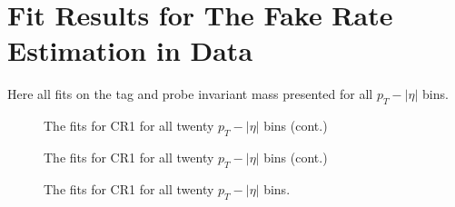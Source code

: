 
\chapter{Fit Results for The Fake Rate Estimation in Data} %

\label{AppendixA} %

Here all fits on the tag and probe invariant mass presented for all $p_T-|\eta|$ bins. 

\begin{figure}[H]
\begin{center}
\scalebox{0.35}{}\scalebox{0.35}{}
\scalebox{0.35}{}\scalebox{0.35}{}
\scalebox{0.35}{}\scalebox{0.35}{}
\caption{The fits for CR1 for all twenty $p_T-|\eta|$ bins (cont.)}
\label{fig:fit_cr1}
\end{center}
\end{figure}

\begin{figure}[H]
\begin{center}
\scalebox{0.35}{}\scalebox{0.35}{}
\scalebox{0.35}{}\scalebox{0.35}{}
\scalebox{0.35}{}\scalebox{0.35}{}
\scalebox{0.35}{}\scalebox{0.35}{}
\caption{The fits for CR1 for all twenty $p_T-|\eta|$ bins (cont.)}
\label{fig:fit_cr1}
\end{center}
\end{figure}

\begin{figure}[H]
\begin{center}
\scalebox{0.35}{}\scalebox{0.35}{}
\scalebox{0.35}{}\scalebox{0.35}{}
\scalebox{0.35}{}\scalebox{0.35}{}
\caption{The fits for CR1 for all twenty $p_T-|\eta|$ bins.}
\label{fig:fit_cr1}
\end{center}
\end{figure}


